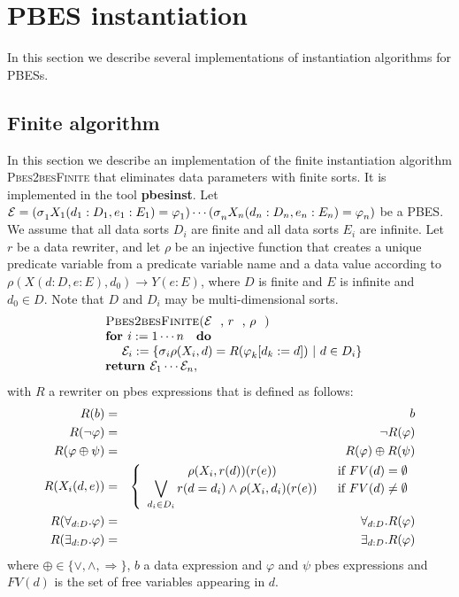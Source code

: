                       

\section{PBES instantiation}

In this section we describe several implementations of instantiation
algorithms for PBESs.

\subsection{Finite algorithm}

In this section we describe an implementation of the finite instantiation
algorithm \textsc{Pbes2besFinite} that eliminates data parameters with
finite sorts. It is implemented in the tool \textbf{pbesinst}. Let $\mathcal{%
E=(\sigma }_{1}X_{1}(d_{1}:D_{1},e_{1}:E_{1})=\varphi _{1})\cdots \mathcal{%
(\sigma }_{n}X_{n}(d_{n}:D_{n},e_{n}:E_{n})=\varphi _{n})$ be a PBES. We
assume that all data sorts $D_{i}$ are finite and all data sorts $E_{i}$ are
infinite. Let $r$ be a data rewriter, and let $\rho $ be an injective
function that creates a unique predicate variable from a predicate variable
name and a data value according to $\rho (X(d:D,e:E),d_{0})\rightarrow Y(e:E)
$, where $D$ is finite and $E$ is infinite and $d_{0}\in D$. Note that $D$
and $D_{i}$ may be multi-dimensional sorts.%
\begin{equation*}
\begin{array}{l}
\text{\textsc{Pbes2besFinite(}}\mathcal{E}\text{, }r\text{, }\rho \text{%
\textsc{)}} \\ 
\text{\textbf{for }}i:=1\cdots n\text{ \textbf{do}} \\ 
\qquad \mathcal{E}_{i}:=\{\mathcal{\sigma }_{i}\rho (X_{i},d)=R(\varphi
_{k}[d_{k}:=d])\ |\ d\in D_{i}\} \\ 
\text{\textbf{return }}\mathcal{E}_{1}\cdots \mathcal{E}_{n},%
\end{array}%
\end{equation*}%
with $R$ a rewriter on pbes expressions that is defined as follows:%
\begin{eqnarray*}
R(b) &=&b \\
R(\lnot \varphi ) &=&\lnot R(\varphi ) \\
R(\varphi \oplus \psi ) &=&R(\varphi )\oplus R(\psi ) \\
R(X_{i}(d,e)) &=&\left\{ 
\begin{array}{cc}
\rho (X_{i},r(d))(r(e)) & \text{if }FV(d)=\emptyset  \\ 
\dbigvee\limits_{d_{i}\in D_{i}}r(d=d_{i})\wedge \rho (X_{i},d_{i})(r(e)) & 
\text{if }FV(d)\neq \emptyset 
\end{array}%
\right.  \\
R(\forall _{d:D}.\varphi ) &=&\forall _{d:D}.R(\varphi ) \\
R(\exists _{d:D}.\varphi ) &=&\exists _{d:D}.R(\varphi )
\end{eqnarray*}%
where $\oplus \in \{\vee ,\wedge ,\Rightarrow \}$, $b$ a data expression and 
$\varphi $ and $\psi $ pbes expressions and $FV(d)$ is the set of free
variables appearing in $d$.\newpage 


